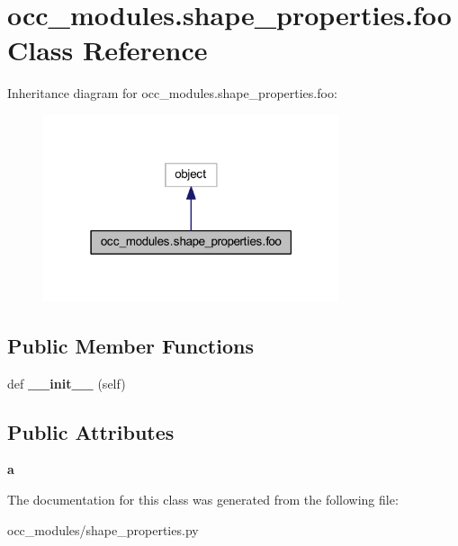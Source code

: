 \hypertarget{a00097}{}\section{occ\+\_\+modules.\+shape\+\_\+properties.\+foo Class Reference}
\label{a00097}


Inheritance diagram for occ\+\_\+modules.\+shape\+\_\+properties.\+foo\+:
\nopagebreak
\begin{figure}[H]
\begin{center}
\leavevmode
\includegraphics[width=247pt]{a00096}
\end{center}
\end{figure}
\subsection*{Public Member Functions}
\begin{DoxyCompactItemize}
\item 
\hypertarget{a00097_a98c7d424e9a336f13462b0651e32f412}{}\label{a00097_a98c7d424e9a336f13462b0651e32f412} 
def {\bfseries \+\_\+\+\_\+init\+\_\+\+\_\+} (self)
\end{DoxyCompactItemize}
\subsection*{Public Attributes}
\begin{DoxyCompactItemize}
\item 
\hypertarget{a00097_ab27abf297cba26da9083afa85a6a05a7}{}\label{a00097_ab27abf297cba26da9083afa85a6a05a7} 
{\bfseries a}
\end{DoxyCompactItemize}


The documentation for this class was generated from the following file\+:\begin{DoxyCompactItemize}
\item 
occ\+\_\+modules/shape\+\_\+properties.\+py\end{DoxyCompactItemize}
